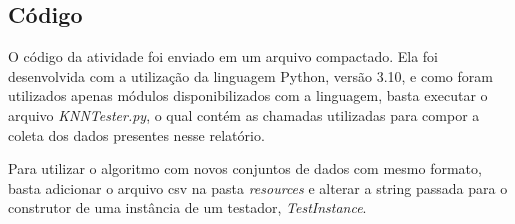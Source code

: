 \documentclass{article}
\begin{document}
\subsection*{Código}

O código da atividade foi enviado em um arquivo compactado. Ela foi desenvolvida com a utilização da linguagem Python, versão 3.10, e como foram utilizados apenas módulos disponibilizados com a linguagem, basta executar o arquivo \emph{KNNTester.py}, o qual contém as chamadas utilizadas para compor a coleta dos dados presentes nesse relatório.

Para utilizar o algoritmo com novos conjuntos de dados com mesmo formato, basta adicionar o arquivo csv na pasta \emph{resources} e alterar a string passada para o construtor de uma instância de um testador, \emph{TestInstance}.
\end{document}
